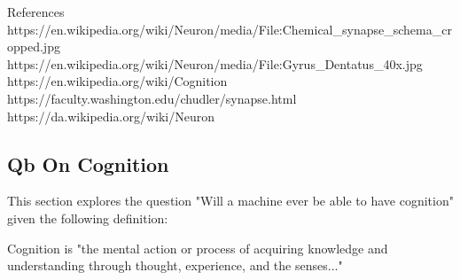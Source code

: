 \documentclass{article}
\begin{document}

\noindent
References
\\
https://en.wikipedia.org/wiki/Neuron/media/File:Chemical\_synapse\_schema\_cropped.jpg
\\
https://en.wikipedia.org/wiki/Neuron/media/File:Gyrus\_Dentatus\_40x.jpg
\\
https://en.wikipedia.org/wiki/Cognition
\\
https://faculty.washington.edu/chudler/synapse.html
\\
https://da.wikipedia.org/wiki/Neuron
\subsection{Qb On Cognition}

This section explores the question "Will a machine ever be able to have cognition" given the following definition:

\begin{displayquote}
Cognition is "the mental action or process of acquiring knowledge and understanding through thought, experience, and the senses..."
\end{displayquote}
\end{document}
